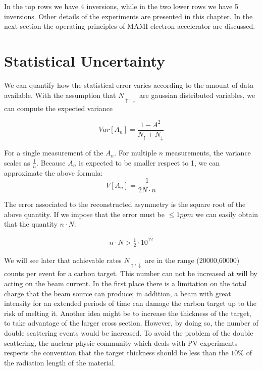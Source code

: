 In the top rows we have 4 inversions, while in the two lower rows we have 5 inversions.
Other details of the experiments are presented in this chapter. In the next section the operating principles of MAMI electron accelerator are discussed.

\section{Statistical Uncertainty}

We can quantify how the statistical error varies according to the amount of data available. With the assumption that $N_{\uparrow,\downarrow}$ are gaussian distributed variables, we can compute the expected variance

\begin{equation}
Var[A_{n}] = \dfrac{1 - A^{2}}{N_{\uparrow} + N_{\downarrow}} 
\end{equation}

For a single measurement of the $A_{n}$. For multiple $n$ measurements, the variance scales as $\frac{1}{n}$.
Because $A_{n}$ is expected to be smaller respect to 1, we can approximate the above formula:
\begin{equation} 
V[A_{n}] = \dfrac{1}{2N \cdot n}  \label{eq:Error}
\end{equation}

The error associated to the reconstructed asymmetry is the square root of the above quantity. If we impose that the error must be $\le 1ppm$ we can easily obtain that the quantity $n\cdot N$:

\begin{align*}
n\cdot N > \frac{1}{2} \cdot 10^{12}
\end{align*} 

We will see later that achievable rates $N_{\uparrow,\downarrow}$ are in the range (20000,60000) counts per event for a carbon target. This number can not be increased at will by acting on the beam current. In the first place there is a limitation on the total charge that the beam source can produce; in addition, a beam with great intensity for an extended periods of time can damage the carbon target up to the risk of melting it. Another idea might be to increase the thickness of the target, to take advantage of the larger cross section. However, by doing so, the number of double scattering events would be increased. To avoid the problem of the double scattering, the nuclear physic community which deals with PV experiments respects the convention that the target thickness should be less than the $10 \%$ of the radiation length of the material.

